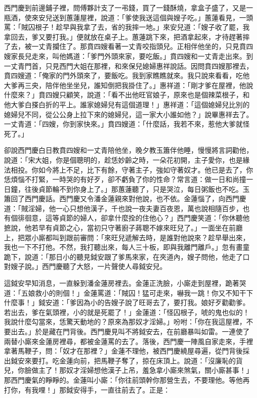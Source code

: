 西門慶到前邊鋪子裡，問傅夥計支了一弔錢，買了一錢酥燒，拿盒子盛了，又是一瓶酒，使來安兒送到蕙蓮屋裡，說道：「爹使我送這個與嫂子吃。」蕙蓮看見，一頭罵：「賊囚根子！趁早與我拿了去，省的我摔一地。」來安兒道：「嫂子收了罷，我拿回去，爹又要打我。」便就放在桌子上。蕙蓮跳下來，把酒拿起來，才待趕著摔了去，被一丈青攔住了。那賁四嫂看著一丈青咬指頭兒。正相伴他坐的，只見賁四嫂家長兒走來，叫他媽道：「爹門外頭來家，要吃飯。」賁四嫂和一丈青走出來。到一丈青門首，只見西門大姐在那裡，和來保兒媳婦惠祥說話。因問賁四嫂那裡去，賁四嫂道：「俺家的門外頭來了，要飯吃。我到家瞧瞧就來。我只說來看看，吃他大爹再三央，陪伴他坐坐兒，誰知倒把我掛住了。」惠祥道：「剛才爹在屋裡，他說什麼來？」賁四嫂只顧笑，說道：「看不出他旺官娘子，原來也是個辣菜根子，和他大爹白搽白折的平上。誰家媳婦兒有這個道理！」惠祥道：「這個媳婦兒比別的媳婦兒不同，從公公身上拉下來的媳婦兒，這一家大小誰如他？」說畢惠祥去了。一丈青道：「四嫂，你到家快來。」賁四嫂道：「什麼話，我若不來，惹他大爹就怪死了。」

卻說西門慶白日教賁四嫂和一丈青陪他坐，晚夕教玉簫伴他睡，慢慢將言詞勸他，說道：「宋大姐，你是個聰明的，趁恁妙齡之時，一朵花初開，主子愛你，也是緣法相投。你如今將上不足，比下有餘，守著主子，強如守著奴才。他已是去了，你恁煩惱不打緊，一時哭的有好歹，卻不虧負了你的性命？常言道：做一日和尚撞一日鐘，往後貞節輪不到你身上了。」那蕙蓮聽了，只是哭泣，每日粥飯也不吃。玉簫回了西門慶話。西門慶又令潘金蓮親來對他說，也不依。金蓮惱了，向西門慶道：「賊淫婦，他一心只想他漢子，千也說一夜夫妻百夜恩，萬也說相隨百步，也有個徘徊意，這等貞節的婦人，卻拿什麼拴的住他心？」西門慶笑道：「你休聽他摭說，他若早有貞節之心，當初只守著廚子蔣聰不嫁來旺兒了。」一面坐在前廳上，把眾小廝都叫到跟前審問：「來旺兒遞解去時，是誰對他說來？趁早舉出來，我也一下不打他。不然，我打聽出來，每人三十板，即與我離門離戶。」忽有畫童跪下，說道：「那日小的聽見鉞安跟了爹馬來家，在夾道內，嫂子問他，他走了口對嫂子說。」西門慶聽了大怒，一片聲使人尋鉞安兒。

這鉞安早知消息，一直躲到潘金蓮房裡去。金蓮正洗臉，小廝走到屋裡，跪著哭道：「五娘救小的則個！」金蓮罵道：「賊囚！猛可走來，嚇我一跳！你又不知干下什麼事！」鉞安道：「爹因為小的告嫂子說了旺哥去了，要打我。娘好歹勸勸爹。若出去，爹在氣頭裡，小的就是死罷了！」金蓮道：「怪囚根子，唬的鬼也似的！我說什麼勾當來，恁驚天動地的？原來為那奴才淫婦。」吩咐：「你在我這屋裡，不要出去。」於是藏在門背後。西門慶見叫不將鉞安去，在前廳暴叫如雷。一連使了兩替小廝來金蓮房裡尋，都被金蓮罵的去了。落後，西門慶一陣風自家走來，手裡拿著馬鞭子，問：「奴才在那裡？」金蓮不理他，被西門慶繞屋尋遍，從門背後採出鉞安來要打。吃金蓮向前，把馬鞭子奪了，掠在床頂上。說道：「沒廉恥的貨兒，你臉做主了！那奴才淫婦想他漢子上吊，羞急拿小廝來煞氣，關小廝甚事！」 那西門慶氣的睜睜的。金蓮叫小廝：「你往前頭幹你那營生去，不要理他。等他再打你，有我哩！」那鉞安得手，一直往前去了。正是：

